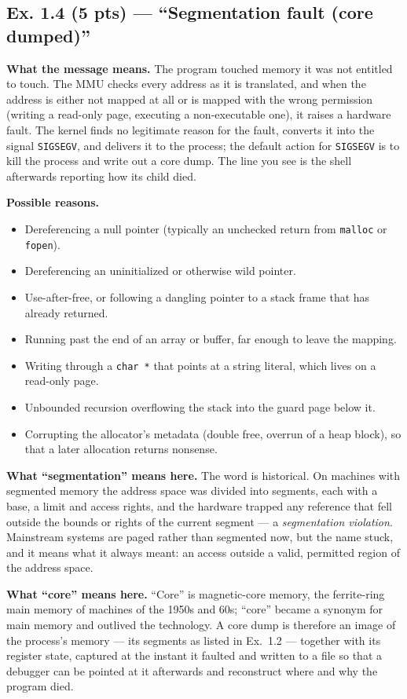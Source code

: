 \subsection*{Ex. 1.4 (5 pts) --- ``Segmentation fault (core dumped)''}
\label{p1:sec:segfault}

\textbf{What the message means.} The program touched memory it was not entitled to touch.
The MMU checks every address as it is translated, and when the address is either not
mapped at all or is mapped with the wrong permission (writing a read-only page, executing
a non-executable one), it raises a hardware fault. The kernel finds no legitimate reason
for the fault, converts it into the signal \texttt{SIGSEGV}, and delivers it to the
process; the default action for \texttt{SIGSEGV} is to kill the process and write out a
core dump. The line you see is the shell afterwards reporting how its child died.

\textbf{Possible reasons.}
\begin{itemize}[nosep,leftmargin=1.4em]
  \item Dereferencing a null pointer (typically an unchecked return from
        \texttt{malloc} or \texttt{fopen}).
  \item Dereferencing an uninitialized or otherwise wild pointer.
  \item Use-after-free, or following a dangling pointer to a stack frame that has
        already returned.
  \item Running past the end of an array or buffer, far enough to leave the mapping.
  \item Writing through a \texttt{char *} that points at a string literal, which lives on
        a read-only page.
  \item Unbounded recursion overflowing the stack into the guard page below it.
  \item Corrupting the allocator's metadata (double free, overrun of a heap block), so
        that a later allocation returns nonsense.
\end{itemize}

\textbf{What ``segmentation'' means here.} The word is historical. On machines with
segmented memory the address space was divided into segments, each with a base, a limit
and access rights, and the hardware trapped any reference that fell outside the bounds or
rights of the current segment --- a \emph{segmentation violation}. Mainstream systems are
paged rather than segmented now, but the name stuck, and it means what it always meant:
an access outside a valid, permitted region of the address space.

\textbf{What ``core'' means here.} ``Core'' is magnetic-core memory, the ferrite-ring
main memory of machines of the 1950s and 60s; ``core'' became a synonym for main memory
and outlived the technology. A core dump is therefore an image of the process's memory
--- its segments as listed in Ex.~1.2 --- together with its register state, captured at
the instant it faulted and written to a file so that a debugger can be pointed at it
afterwards and reconstruct where and why the program died.
